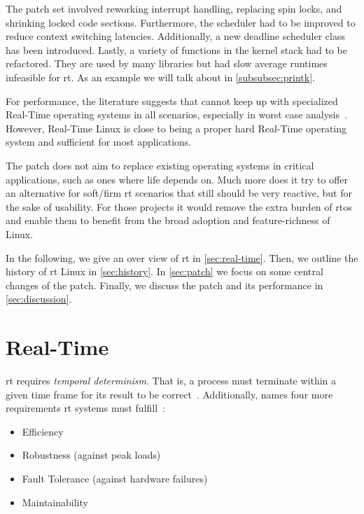 \documentclass[10pt,twocolumn,a4paper]{article}
\begin{document}
The  patch set involved reworking interrupt handling, replacing spin locks, and shrinking locked code sections.
Furthermore, the scheduler had to be improved to reduce context switching latencies.
Additionally, a new deadline scheduler class has been introduced.
Lastly, a variety of functions in the kernel stack had to be refactored.
They are used by many libraries but had slow average runtimes infeasible for \acrshort{rt}.
As an example we will talk about  in \autoref{subsubsec:printk}.

For performance, the literature suggests that  cannot keep up with specialized Real-Time operating systems in all scenarios, especially in worst case analysis~\cite{reghenzani_realtime_2019,li_performance_2023}.
However, Real-Time Linux is close to being a proper hard Real-Time operating system and sufficient for most applications.

The patch does not aim to replace existing operating systems in critical applications, such as ones where life depends on.
Much more does it try to offer an alternative for soft/firm \acrshort{rt} scenarios that still should be very reactive, but for the sake of usability.
For those projects it would remove the extra burden of  \acrshort{rtos} and enable them to benefit from the broad adoption and feature-richness of Linux.

In the following, we give an over view of \acrshort{rt} in \autoref{sec:real-time}.
Then, we outline the history of \acrshort{rt} Linux in \autoref{sec:history}.
In \autoref{sec:patch} we focus on some central changes of the  patch.
Finally, we discuss the patch and its performance in \autoref{sec:discussion}.
\section{Real-Time}\label{sec:real-time}
\acrfull{rt} requires \emph{temporal determinism}.
That is, a process must terminate within a given time frame for its result to be correct~\cite{reghenzani_realtime_2019}.
Additionally, \citeauthor{buttazzo_hard_1997} names four more requirements \acrshort{rt} systems must fulfill~\cite{buttazzo_hard_1997}:

\begin{itemize}
  \item Efficiency
  \item Robustness (against peak loads)
  \item Fault Tolerance (against hardware failures)
  \item Maintainability
\end{itemize}
\end{document}
